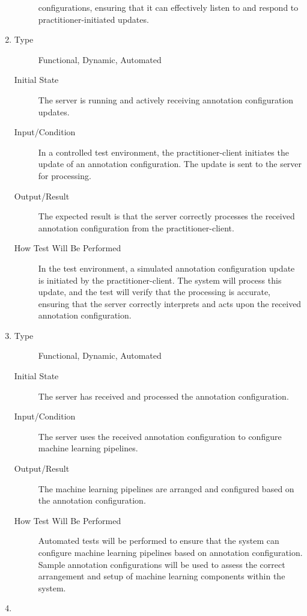 \documentclass[12pt, titlepage]{article}
\begin{document}
\begin{enumerate}[FR-T1]
\begin{description}
    configurations, ensuring that it can effectively listen to and respond to
    practitioner-initiated updates.
  \end{description}
\item \label{FRT7}
  \begin{description}
  \item[Type] Functional, Dynamic, Automated
  \item[Initial State] The server is running and actively receiving annotation
    configuration updates.
  \item[Input/Condition] In a controlled test environment, the practitioner-client
    initiates the update of an annotation configuration. The update is sent to
    the server for processing.
  \item[Output/Result] The expected result is that the server correctly processes
    the received annotation configuration from the practitioner-client.
  \item[How Test Will Be Performed] In the test environment, a simulated annotation
    configuration update is initiated by the practitioner-client. The system
    will process this update, and the test will verify that the processing is
    accurate, ensuring that the server correctly interprets and acts upon the
    received annotation configuration.
  \end{description}
\item \label{FRT8}
  \begin{description}
  \item[Type] Functional, Dynamic, Automated
  \item[Initial State] The server has received and processed the annotation
    configuration.
  \item[Input/Condition] The server uses the received annotation configuration to
    configure machine learning pipelines.
  \item[Output/Result] The machine learning pipelines are arranged and configured
    based on the annotation configuration.
  \item[How Test Will Be Performed] Automated tests will be performed to ensure
    that the system can configure machine learning pipelines based on annotation
    configuration. Sample annotation configurations will be used to assess the
    correct arrangement and setup of machine learning components within the
    system.
  \end{description}
\item \label{FRT9}
  \begin{description}

\end{description}
\end{enumerate}
\end{document}
